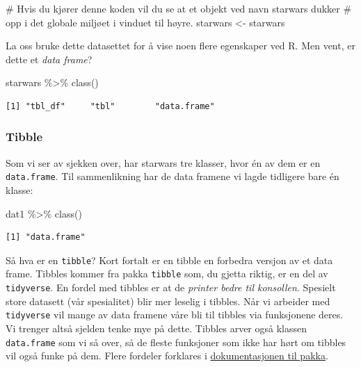 \documentclass[
  letterpaper,
  DIV=11,
  numbers=noendperiod]{scrartcl}
\newenvironment{Shaded}{\begin{snugshade}}{\end{snugshade}}
\newcommand{\CommentTok}[1]{\textcolor[rgb]{0.37,0.37,0.37}{#1}}
\newcommand{\FunctionTok}[1]{\textcolor[rgb]{0.28,0.35,0.67}{#1}}
\newcommand{\NormalTok}[1]{\textcolor[rgb]{0.00,0.23,0.31}{#1}}
\newcommand{\OtherTok}[1]{\textcolor[rgb]{0.00,0.23,0.31}{#1}}
\newcommand{\SpecialCharTok}[1]{\textcolor[rgb]{0.37,0.37,0.37}{#1}}
\begin{document}
\begin{Shaded}
\begin{Highlighting}[]
\CommentTok{\# Hvis du kjører denne koden vil du se at et objekt ved navn \textasciigrave{}starwars\textasciigrave{} dukker }
\CommentTok{\# opp i det globale miljøet i vinduet til høyre.}
\NormalTok{starwars }\OtherTok{\textless{}{-}}\NormalTok{ starwars}
\end{Highlighting}
\end{Shaded}

La oss bruke dette datasettet for å vise noen flere egenskaper ved R.
Men vent, er dette et \emph{data frame}?

\begin{Shaded}
\begin{Highlighting}[]
\NormalTok{starwars }\SpecialCharTok{\%\textgreater{}\%} \FunctionTok{class}\NormalTok{()}
\end{Highlighting}
\end{Shaded}

\begin{verbatim}
[1] "tbl_df"     "tbl"        "data.frame"
\end{verbatim}

\hypertarget{tibble}{%
\subsubsection{Tibble}\label{tibble}}

Som vi ser av sjekken over, har starwars tre klasser, hvor én av dem er
en \texttt{data.frame}. Til sammenlikning har de data framene vi lagde
tidligere bare én klasse:

\begin{Shaded}
\begin{Highlighting}[]
\NormalTok{dat1 }\SpecialCharTok{\%\textgreater{}\%} \FunctionTok{class}\NormalTok{()}
\end{Highlighting}
\end{Shaded}

\begin{verbatim}
[1] "data.frame"
\end{verbatim}

Så hva er en \texttt{tibble}? Kort fortalt er en tibble en forbedra
versjon av et data frame. Tibbles kommer fra pakka \texttt{tibble} som,
du gjetta riktig, er en del av \texttt{tidyverse}. En fordel med tibbles
er at de \emph{printer bedre til konsollen}. Spesielt store datasett
(vår spesialitet) blir mer leselig i tibbles. Når vi arbeider med
\texttt{tidyverse} vil mange av data framene våre bli til tibbles via
funksjonene deres. Vi trenger altså sjelden tenke mye på dette. Tibbles
arver også klassen \texttt{data.frame} som vi så over, så de fleste
funksjoner som ikke har hørt om tibbles vil også funke på dem. Flere
fordeler forklares i
\href{https://tibble.tidyverse.org/}{dokumentasjonen til pakka}.
\end{document}
